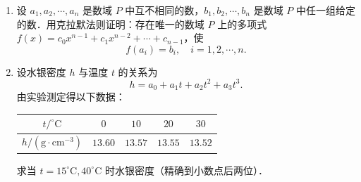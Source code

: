 \begin{enumerate}
\begin{enumerate}
\[\begin{cases}
      5x_1+6x_2=1,\\
      x_1+5x_2+6x_3=0,\\
      x_2+5x_3+6x_4=0,\\
      x_3+5x_4+6x_5=0,\\
      x_4+5x_5=1.
    \end{cases}
    \]
  \anssub
  \end{enumerate}
  \item 设 $a_1,a_2,\cdots,a_n$ 是数域 $P$ 中互不相同的数，$b_1,b_2,\cdots,b_n$ 是数域 $P$ 中任一组给定的数．用克拉默法则证明：存在唯一的数域 $P$ 上的多项式 $f(x)=c_0x^{n-1}+c_1x^{n-2}+\cdots+c_{n-1}$，使
  \[
    f(a_i)=b_i,\quad i=1,2,\cdots,n.
  \]
  \ansproof
  \item 设水银密度 $h$ 与温度 $t$ 的关系为
  \[
    h=a_0+a_1t+a_2t^2+a_3t^3.
  \]
  由实验测定得以下数据：
  \begin{center}
    \begin{tabular}{c|cccc}
      $t/^{\circ}\mathrm{C}$ & $0$ & $10$ & $20$ & $30$\\ \hline
      $h/(\mathrm{g}\cdot\mathrm{cm}^{-3})$ & $13.60$ & $13.57$ & $13.55$ & $13.52$
    \end{tabular}
  \end{center}
  求当 $t=15^{\circ}\mathrm{C},40^{\circ}\mathrm{C}$ 时水银密度（精确到小数点后两位）．
  \anscompute
\end{enumerate}

